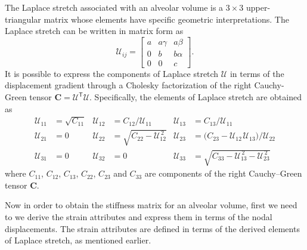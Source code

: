 The Laplace stretch associated with an alveolar volume is a $3\times3$ upper-triangular matrix whose elements have specific geometric interpretations. The Laplace stretch can be written in matrix form as \cite{FreedSrinivasa15}
\begin{equation}
    \label{LagrangianPhysicalStretch}
    \mathcal{U}_{ij} = \begin{bmatrix}
    a & a \gamma & a \beta \\
    0 & b & b \alpha \\
    0 & 0 & c \end{bmatrix} .
\end{equation}
It is possible to express the components of Laplace stretch $\boldsymbol{\mathcal{U}}$ in terms of the displacement gradient through a Cholesky factorization of the right Cauchy-Green tensor $\mathbf{C} = \boldsymbol{\mathcal{U}}^{\mathsf{T}} \boldsymbol{\mathcal{U}}$. Specifically, the elements of Laplace stretch are obtained as \cite{Srinivasa12}
\begin{equation}
\begin{aligned}
\mathcal{U}_{11} & = \sqrt{C_{11}} & 
\mathcal{U}_{12} & = C_{12} / \mathcal{U}_{11} &
\mathcal{U}_{13} & = C_{13} / \mathcal{U}_{11} \\
\mathcal{U}_{21} & = 0 &
\mathcal{U}_{22} & = \sqrt{C_{22} - \mathcal{U}_{12}^{\,2}} &
\mathcal{U}_{23} & = \bigl( C_{23} - \mathcal{U}_{12\,}\mathcal{U}_{13} \bigr) / \mathcal{U}_{22} \\
\mathcal{U}_{31} & = 0 &
\mathcal{U}_{32} & = 0 & 
\mathcal{U}_{33} & = \sqrt{C_{33} - \mathcal{U}_{13}^{\,2} - \mathcal{U}_{23}^{\,2}}
\end{aligned}
\label{LagrangianLaplaceStretch}
\end{equation}
where ${C_{11}}$, ${C_{12}}$, ${C_{13}}$, $C_{22}$, $C_{23}$ and ${C_{33}}$ are components of the right Cauchy--Green tensor $\mathbf{C}$.

Now in order to obtain the stiffness matrix for an alveolar volume, first we need to we derive the strain attributes and express them in terms of the nodal displacements. The strain attributes are defined in terms of the derived elements of Laplace stretch, as mentioned earlier.

